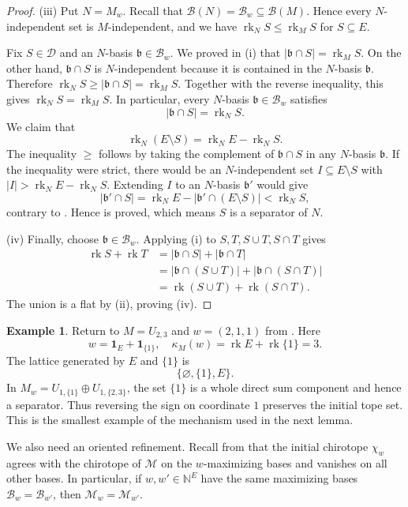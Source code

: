 \documentclass[10pt]{amsart}
\theoremstyle{plain}
\theoremstyle{definition}
\newtheorem{example}[theorem]{Example}
\newcommand{\one}{\mathbf{1}}
\newcommand{\NN}{\mathbb{N}}
\newcommand{\B}{\mathcal{B}}
\newcommand{\D}{\mathcal{D}}
\newcommand{\M}{\mathcal{M}}
\newcommand{\rk}{\operatorname{rk}}
\newcommand{\bb}{\mathfrak{b}}
\begin{document}
\begin{proof}
(iii) Put $N=M_w$. Recall that $\B(N)=\B_w\subseteq\B(M)$. Hence every $N$-independent set is $M$-independent, and we have $\rk_N S\leq\rk_M S$ for $S\subseteq E$.

Fix $S\in\D$ and an $N$-basis $\bb\in\B_w$. We proved in (i) that $|\bb\cap S|=\rk_M S$. On the other hand, $\bb\cap S$ is $N$-independent because it is contained in the $N$-basis $\bb$. Therefore $\rk_N S\geq|\bb\cap S|=\rk_M S$. Together with the reverse inequality, this gives $\rk_N S=\rk_M S$. In particular, every $N$-basis $\bb\in\B_w$ satisfies
\begin{equation}\label{saturation-on-N}
|\bb\cap S|=\rk_N S. 
\end{equation}
We claim that
\begin{equation}\label{S-is-separator}
\rk_N(E\setminus S)=\rk_N E-\rk_N S.    
\end{equation}
The inequality $\geq$ follows by taking the complement of $\bb\cap S$ in any $N$-basis $\bb$.  If the inequality were strict, there would be an $N$-independent set $I\subseteq E\setminus S$ with $|I|>\rk_N E-\rk_N S$. Extending $I$ to an $N$-basis $\bb'$ would give
\[
|\bb'\cap S|=\rk_N E-|\bb'\cap(E\setminus S)|<\rk_N S,
\]
contrary to . Hence  is proved, which means $S$ is a separator of $N$.

(iv) Finally, choose $\bb\in\B_w$. Applying (i) to $S,T,S\cup T,S\cap T$ gives
\begin{align*}
\rk S+\rk T&=|\bb\cap S|+|\bb\cap T|\\
 &=|\bb\cap(S\cup T)|+|\bb\cap(S\cap T)|\\
 &=\rk(S\cup T)+\rk(S\cap T).
\end{align*}
The union is a flat by (ii), proving (iv).
\end{proof}




\begin{example}\label{tight-U23}
Return to $M=U_{2,3}$ and $w=(2,1,1)$ from . Here
\[
w=\one_E+\one_{\{1\}},\quad \kappa_M(w)=\rk E+\rk\{1\}=3.
\]
The lattice generated by $E$ and $\{1\}$ is
\[
\{\varnothing,\{1\},E\}.
\]
In $M_w=U_{1,\{1\}}\oplus U_{1,\{2,3\}}$, the set $\{1\}$ is a whole direct sum component and hence a separator. Thus reversing the sign on coordinate $1$ preserves the initial tope set. This is the smallest example of the mechanism used in the next lemma.
\end{example}

We also need an oriented refinement. Recall from  that the initial chirotope $\chi_w$ agrees with the chirotope of $\M$ on the $w$-maximizing bases and vanishes on all other bases. In particular, if $w,w'\in\NN^E$ have the same maximizing bases $\B_w=\B_{w'}$, then $\M_w=\M_{w'}$.
\end{document}

